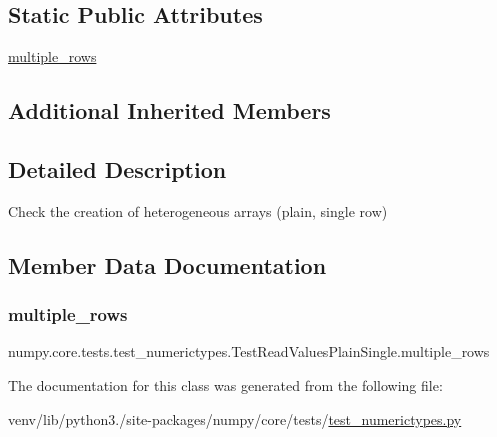 \subsection*{Static Public Attributes}
\begin{DoxyCompactItemize}
\item 
\hyperlink{classnumpy_1_1core_1_1tests_1_1test__numerictypes_1_1TestReadValuesPlainSingle_a9b935fd4a4147d4e97f5b195135774a6}{multiple\+\_\+rows}
\end{DoxyCompactItemize}
\subsection*{Additional Inherited Members}


\subsection{Detailed Description}
\begin{DoxyVerb}Check the creation of heterogeneous arrays (plain, single row)\end{DoxyVerb}
 

\subsection{Member Data Documentation}
\mbox{\label{classnumpy_1_1core_1_1tests_1_1test__numerictypes_1_1TestReadValuesPlainSingle_a9b935fd4a4147d4e97f5b195135774a6}} 
\subsubsection{\texorpdfstring{multiple\+\_\+rows}{multiple\_rows}}
{\footnotesize\ttfamily numpy.\+core.\+tests.\+test\+\_\+numerictypes.\+Test\+Read\+Values\+Plain\+Single.\+multiple\+\_\+rows\hspace{0.3cm}{\ttfamily [static]}}



The documentation for this class was generated from the following file\+:\begin{DoxyCompactItemize}
\item 
venv/lib/python3./site-\/packages/numpy/core/tests/\hyperlink{test__numerictypes_8py}{test\+\_\+numerictypes.\+py}\end{DoxyCompactItemize}
